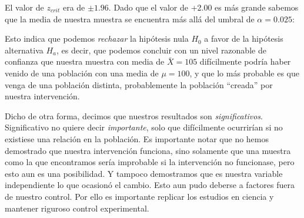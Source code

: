 \documentclass[a4paper,12pt]{article}
\begin{document}
El valor de $z_{crit}$ era de $\pm 1{.}96$. Dado que el valor de +2.00 es más grande sabemos que la media de nuestra muestra se encuentra más allá del umbral de $\alpha = 0{.}025$:

\begin{figure}[!ht]
  \begin{center}
  \end{center}
\end{figure}

Esto indica que podemos {\slshape rechazar} la hipótesis nula $H_{0}$ a favor de la hipótesis alternativa $H_{a}$, es decir, que podemos concluir con un nivel razonable de confianza que nuestra muestra con media de $\bar{X} = 105$ difícilmente podría haber venido de una población con una media de $\mu = 100$, y que lo más probable es que venga de una población distinta, probablemente la población ``creada'' por nuestra intervención.

Dicho de otra forma, decimos que nuestros resultados son {\slshape significativos}. Significativo no quiere decir {\slshape importante}, solo que difícilmente ocurrirían si no existiese una relación en la población. Es importante notar que no hemos demostrado que nuestra intervención funciona, sino solamente que una muestra como la que encontramos sería improbable si la intervención no funcionase, pero esto aun es una posibilidad. Y tampoco demostramos que es nuestra variable independiente lo que ocasionó el cambio. Esto aun pudo deberse a factores fuera de nuestro control. Por ello es importante replicar los estudios en ciencia y mantener riguroso control experimental.
\end{document}
